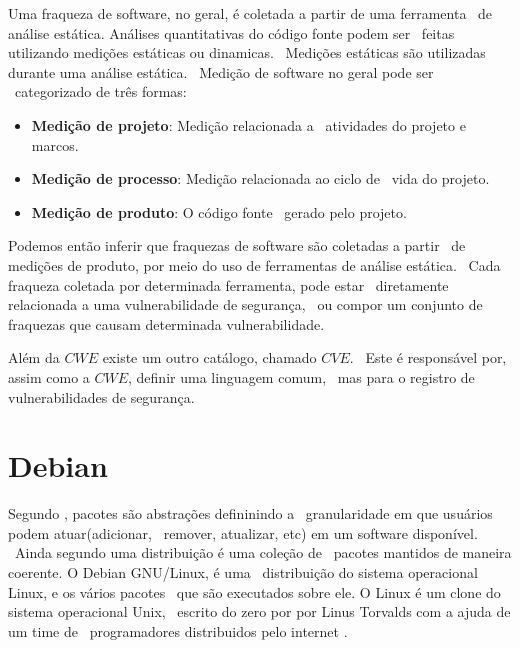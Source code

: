 Uma fraqueza de software, no geral, é coletada a partir de uma ferramenta \
de análise estática. Análises quantitativas do código fonte podem ser \
feitas utilizando medições estáticas ou dinamicas. \
Medições estáticas são utilizadas durante uma análise estática\cite{Fenton}. \
Medição de software no geral pode ser \
categorizado de três formas\cite{Fenton}:

\begin{itemize}
\item \textbf{Medição de projeto}: Medição relacionada a \
        atividades do projeto e marcos.
\item \textbf{Medição de processo}: Medição relacionada ao ciclo de \
        vida do projeto.
\item \textbf{Medição de produto}: O código fonte \
        gerado pelo projeto.
\end{itemize}

Podemos então inferir que fraquezas de software são coletadas a partir \
de medições de produto, por meio do uso de ferramentas de análise estática. \
Cada fraqueza coletada por determinada ferramenta, pode estar \
diretamente relacionada a uma vulnerabilidade de segurança, \
ou compor um conjunto de fraquezas que causam determinada vulnerabilidade.


Além da $CWE$ existe um outro catálogo, chamado $CVE$. \
Este é responsável por, assim como a $CWE$, definir uma linguagem comum, \
mas para o registro de vulnerabilidades de segurança.


\section{Debian}
Segundo \cite{Zacchiroli}, pacotes são abstrações defininindo a \
granularidade em que usuários podem atuar(adicionar, \
remover, atualizar, etc) em um software disponível. \
Ainda segundo \cite{Zacchiroli} uma distribuição é uma coleção de \
pacotes mantidos de maneira coerente.  O Debian GNU/Linux, é uma \
distribuição do sistema operacional Linux, e os vários pacotes \
que são executados sobre ele\cite{Debian}.
O Linux é um clone do sistema operacional Unix, \
escrito do zero por por Linus Torvalds com a ajuda de um time de \
programadores distribuidos pelo internet \cite{Linux}.

